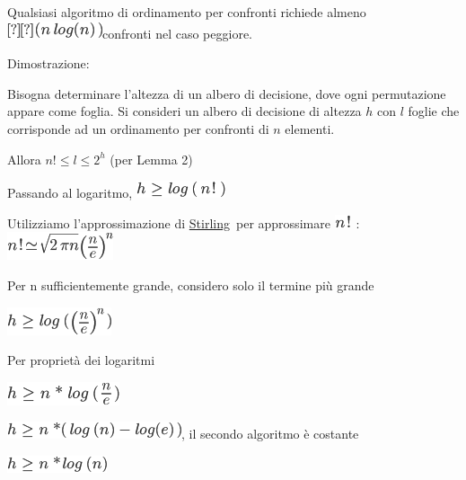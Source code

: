 \documentclass{article}
\begin{document}
{Qualsiasi algoritmo di ordinamento per confronti richiede almeno
}\includegraphics{images/image153.png}{confronti nel caso peggiore.}

{Dimostrazione:}

{Bisogna determinare l'altezza di un albero di decisione, dove ogni permutazione appare come foglia. Si consideri un albero di decisione di altezza $h$ con $l$ foglie che corrisponde ad un ordinamento per confronti di $n$ elementi. }

{Allora $n! \leq l \leq 2^h$ (per Lemma 2)}

{Passando al logaritmo, }\includegraphics{images/image174.png}

{Utilizziamo l'approssimazione di
}{\href{https://www.google.com/url?q=https://it.wikipedia.org/wiki/Approssimazione_di_Stirling\&sa=D\&ust=1523379128517000}{Stirling}}{~per
approssimare }\includegraphics{images/image160.png}{~:
}\includegraphics{images/image175.png}{~}

{Per n sufficientemente grande, considero solo il termine più grande}

\includegraphics{images/image176.png}

{Per proprietà dei logaritmi}

\includegraphics{images/image177.png}

\includegraphics{images/image178.png}{, il secondo algoritmo è costante}

\includegraphics{images/image179.png}
\end{document}
